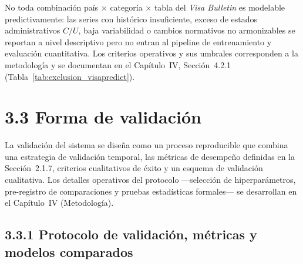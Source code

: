 \documentclass[12pt,letterpaper]{report}
\begin{document}
No toda combinación país $\times$ categoría $\times$ tabla del \textit{Visa Bulletin} es modelable predictivamente: las series con histórico insuficiente, exceso de estados administrativos $C/U$, baja variabilidad o cambios normativos no armonizables se reportan a nivel descriptivo pero no entran al pipeline de entrenamiento y evaluación cuantitativa. Los criterios operativos y sus umbrales corresponden a la metodología y se documentan en el Capítulo~IV, Sección~4.2.1 (Tabla~\ref{tab:exclusion_visapredict}).

\section{3.3 Forma de validación}

La validación del sistema se diseña como un proceso reproducible que combina una estrategia de validación temporal, las métricas de desempeño definidas en la Sección~2.1.7, criterios cualitativos de éxito y un esquema de validación cualitativa. Los detalles operativos del protocolo ---selección de hiperparámetros, pre-registro de comparaciones y pruebas estadísticas formales--- se desarrollan en el Capítulo~IV (Metodología).

\subsection*{3.3.1 Protocolo de validación, métricas y modelos comparados}
\end{document}
